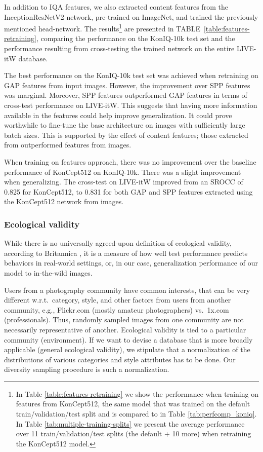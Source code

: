 \documentclass[10pt,journal,compsoc]{IEEEtran}
\begin{document}
In addition to IQA features, we also extracted content features from the InceptionResNetV2 network, pre-trained on ImageNet, and trained the previously mentioned head-network. The results\footnote{In Table \ref{table:features-retraining} we show the performance when training on features from KonCept512, the same model that was trained on the default train/validation/test split and is compared to in Table \ref{tab:perfcomp_koniq}. In Table \ref{tab:multiple-training-splits} we present the average performance over 11 train/validation/test splits (the default + 10 more) when retraining the KonCept512 model.} are presented in TABLE~\ref{table:features-retraining}, comparing the performance on the KonIQ-10k test set and the performance resulting from cross-testing the trained network on the entire LIVE-itW database.

The best performance on the KonIQ-10k test set was achieved when retraining on GAP features from  input images. However, the improvement over SPP features was marginal. Moreover, SPP features outperformed GAP features in terms of cross-test performance on LIVE-itW. This suggests that having more information available in the features could help improve generalization. It could prove worthwhile to fine-tune the base architecture on  images with sufficiently large batch sizes. This is supported by the effect of content features; those extracted from  outperformed features from  images. 

When training on features approach, there was no improvement over the baseline performance of KonCept512 on KonIQ-10k. There was a slight improvement when generalizing. The cross-test on LIVE-itW improved from an SROCC of 0.825 for KonCept512, to 0.831 for both GAP and SPP features extracted using the KonCept512 network from   images.

\subsubsection{Ecological validity}

While there is no universally agreed-upon definition of ecological validity, according to Britannica \cite{gouvier_ecological}, it is a measure of how well test performance predicts behaviors in real-world settings, or, in our case, generalization performance of our model to in-the-wild images.

Users from a photography community have common interests, that can be very different w.r.t.\ category, style, and other factors from users from another community, e.g., Flickr.com (mostly amateur photographers) vs.\ 1x.com (professionals). Thus, randomly sampled images from one community are not necessarily representative of another. Ecological validity is tied to a particular community (environment). If we want to devise a database that is more broadly applicable (general ecological validity), we stipulate that a normalization of the distributions of various categories and style attributes has to be done. Our diversity sampling procedure is such a normalization.
\end{document}
